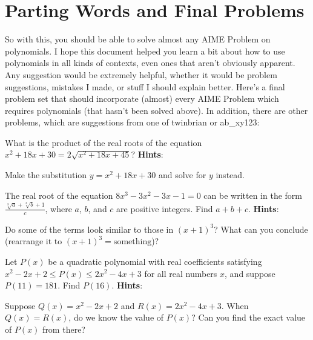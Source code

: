 \documentclass[11pt,titlepage]{scrartcl}
\newenvironment{hint}{\footnotesize \normalfont \textbf{Hints}:}{\hspace{-0.5ex}}
\begin{document}
\section{Parting Words and Final Problems}
So with this, you should be able to solve almost any AIME Problem on polynomials. I hope this document helped you learn a bit about how to use polynomials in all kinds of contexts, even ones that aren't obviously apparent. Any suggestion would be extremely helpful, whether it would be problem suggestions, mistakes I made, or stuff I should explain better. Here's a final problem set that should incorporate (almost) every AIME Problem which requires polynomials (that hasn't been solved above). In addition, there are other problems, which are suggestions from one of twinbrian or ab\_xy123:
\begin{problem}
What is the product of the real roots of the equation $x^2 + 18x + 30 = 2 \sqrt{x^2 + 18x + 45}$?
\begin{hint}
\begin{addhint}{
Make the substitution $y=x^2+18x+30$ and solve for $y$ instead.
}\end{addhint}
\end{hint}
\end{problem}
\begin{problem}
The real root of the equation $8x^3 - 3x^2 - 3x - 1 = 0$ can be written in the form $\frac{\sqrt[3]a + \sqrt[3]b + 1}{c}$, where $a$, $b$, and $c$ are positive integers. Find $a+b+c$.
\begin{hint}
\begin{addhint}{
Do some of the terms look similar to those in $(x+1)^3$? What can you conclude (rearrange it to $(x+1)^3=\text{something}$)?
}\end{addhint}
\end{hint}
\end{problem}
\begin{problem}
Let $P(x)$ be a quadratic polynomial with real coefficients satisfying $x^2 - 2x + 2 \le P(x) \le 2x^2 - 4x + 3$ for all real numbers $x$, and suppose $P(11) = 181$. Find $P(16)$.
\begin{hint}
\begin{addhint}{
Suppose $Q(x)=x^2-2x+2$ and $R(x)=2x^2-4x+3$. When $Q(x)=R(x)$, do we know the value of $P(x)$? Can you find the exact value of $P(x)$ from there?
}\end{addhint}
\end{hint}
\end{problem}
\end{document}
